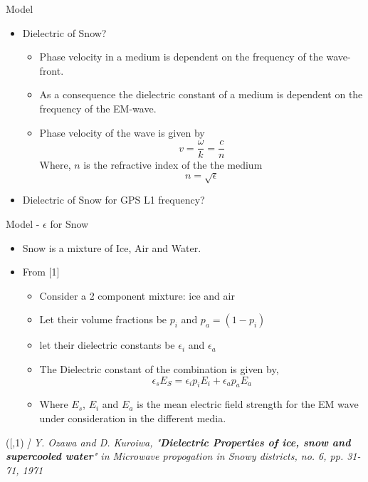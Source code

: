 \documentclass{beamer}
\newenvironment{reference}[2]{%
  \begin{textblock*}{\textwidth}(#1,#2) 
      \footnotesize\it\bgroup\color{red!50!black}}{\egroup\end{textblock*}}
\begin{document}
\begin{frame}{Model}
\begin{itemize}
  \item Dielectric of Snow?
    \begin{itemize}
      \item Phase velocity in a medium is dependent on the frequency of the wave-front.
      \item As a consequence the dielectric constant of a medium is dependent on the frequency of the EM-wave.
      \item Phase velocity of the wave is given by
        \begin{equation*}
          v = \frac{\omega}{k} = \frac{c}{n}
        \end{equation*}
        Where, $n$ is the refractive index of the the medium
        \begin{equation*}
          n = \sqrt{\epsilon}
        \end{equation*}
    \end{itemize}
    \item Dielectric of Snow for GPS L1 frequency?
\end{itemize}
\end{frame}

\begin{frame}{Model - $\epsilon$ for Snow}
\begin{itemize}
  \item Snow is a mixture of Ice, Air and Water.
  \item From [1]
    \begin{itemize}
      \item Consider a 2 component mixture: ice and air
      \item Let their volume fractions be $p_i$ and $p_a=(1-p_i)$
      \item let their dielectric constants be $\epsilon_i$ and $\epsilon_a$
      \item The Dielectric constant of the combination is given by,
        \begin{equation}
          \epsilon_s E_S = \epsilon_i p_i E_i + \epsilon_a p_a E_a
        \end{equation}
      \item Where $E_s$, $E_i$ and $E_a$ is the mean electric field strength for the EM wave under consideration in the different media.
    \end{itemize}
\end{itemize}

\begin{reference}{4mm}{85mm}
  [1] Y. Ozawa and D. Kuroiwa, "\emph{\bf Dielectric Properties of ice, snow and supercooled water}" in Microwave propogation in Snowy districts, no. 6, pp. 31-71, 1971
\end{reference}

\end{frame}
\end{document}
